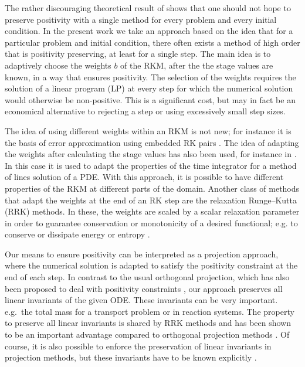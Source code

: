 \documentclass[a4paper]{article}
\numberwithin{equation}{section}
\theoremstyle{plain}
\theoremstyle{definition}
\numberwithin{theorem}{section}
\newcommand{\1}{\mathbbm{1}}
\begin{document}
The rather discouraging theoretical result of \cite{bolley_conservation_1978} shows that one
should not hope to preserve positivity with a single method for every problem and every
initial condition.  In the present work we take an approach based on the idea that for
a particular problem and initial condition, there often exists a method of high order
that is positivity preserving, at least for a single step.
The main idea is to adaptively choose the weights $b$ of the RKM, after the
the stage values are known, in a way that ensures positivity.  
The selection of the weights requires the solution of a linear program (LP) at every
step for which the numerical solution would otherwise be non-positive.
This is a significant cost, but may in fact be an economical alternative to rejecting
a step or using excessively small step sizes.

The idea of using different weights within an RKM is not new; for instance it is
the basis of error approximation using embedded RK pairs \cite{hairer_solving_1993}.
The idea of adapting the weights after calculating the stage values has also been used,
for instance in \cite{ketcheson_spatially_2013}.
In this case it is used to adapt the properties of the time integrator for a method of lines solution of a PDE. With this approach, it is possible to have different properties of the RKM at different parts of the domain. 
Another class of methods that adapt the weights at the end of an RK step
are the relaxation Runge--Kutta (RRK) methods. 
In these, the weights are scaled by a scalar relaxation parameter in order to guarantee
conservation or monotonicity of a desired functional; e.g. to conserve or
dissipate energy or entropy
\cite{ketcheson_relaxation_2019,ranocha_relaxation_2019,ranocha2020general}.

Our means to ensure positivity can be interpreted as a projection
approach, where the numerical solution is adapted to satisfy the
positivity constraint at the end of each step. In contrast to the
usual orthogonal projection, which has also been proposed to deal
with positivity constraints \cite{shampine1986conservation},
our approach preserves all linear invariants of the given ODE. These
invariants can be very important. e.g.\ the total mass for a transport
problem or in reaction systems. The property to preserve all linear
invariants is shared by RRK methods and has been shown to be an
important advantage compared to orthogonal projection methods
\cite{ranocha2020relaxationHamiltonian}. Of course, it is also
possible to enforce the preservation of linear invariants in projection
methods, but these invariants have to be known explicitly
\cite{sandu2001positive}.
\end{document}
